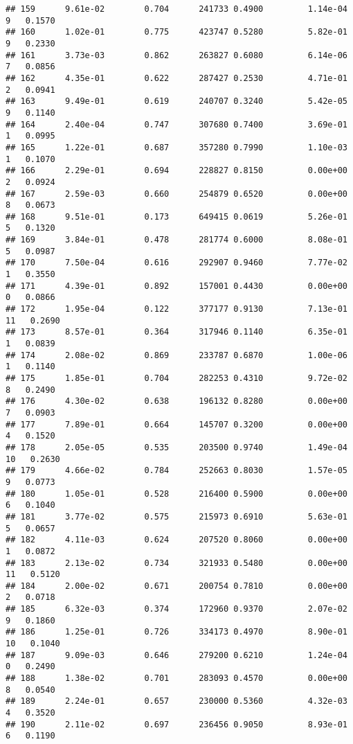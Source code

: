 \documentclass[
]{article}
\begin{document}
\begin{verbatim}
## 159      9.61e-02        0.704      241733 0.4900         1.14e-04   9   0.1570
## 160      1.02e-01        0.775      423747 0.5280         5.82e-01   9   0.2330
## 161      3.73e-03        0.862      263827 0.6080         6.14e-06   7   0.0856
## 162      4.35e-01        0.622      287427 0.2530         4.71e-01   2   0.0941
## 163      9.49e-01        0.619      240707 0.3240         5.42e-05   9   0.1140
## 164      2.40e-04        0.747      307680 0.7400         3.69e-01   1   0.0995
## 165      1.22e-01        0.687      357280 0.7990         1.10e-03   1   0.1070
## 166      2.29e-01        0.694      228827 0.8150         0.00e+00   2   0.0924
## 167      2.59e-03        0.660      254879 0.6520         0.00e+00   8   0.0673
## 168      9.51e-01        0.173      649415 0.0619         5.26e-01   5   0.1320
## 169      3.84e-01        0.478      281774 0.6000         8.08e-01   5   0.0987
## 170      7.50e-04        0.616      292907 0.9460         7.77e-02   1   0.3550
## 171      4.39e-01        0.892      157001 0.4430         0.00e+00   0   0.0866
## 172      1.95e-04        0.122      377177 0.9130         7.13e-01  11   0.2690
## 173      8.57e-01        0.364      317946 0.1140         6.35e-01   1   0.0839
## 174      2.08e-02        0.869      233787 0.6870         1.00e-06   1   0.1140
## 175      1.85e-01        0.704      282253 0.4310         9.72e-02   8   0.2490
## 176      4.30e-02        0.638      196132 0.8280         0.00e+00   7   0.0903
## 177      7.89e-01        0.664      145707 0.3200         0.00e+00   4   0.1520
## 178      2.05e-05        0.535      203500 0.9740         1.49e-04  10   0.2630
## 179      4.66e-02        0.784      252663 0.8030         1.57e-05   9   0.0773
## 180      1.05e-01        0.528      216400 0.5900         0.00e+00   6   0.1040
## 181      3.77e-02        0.575      215973 0.6910         5.63e-01   5   0.0657
## 182      4.11e-03        0.624      207520 0.8060         0.00e+00   1   0.0872
## 183      2.13e-02        0.734      321933 0.5480         0.00e+00  11   0.5120
## 184      2.00e-02        0.671      200754 0.7810         0.00e+00   2   0.0718
## 185      6.32e-03        0.374      172960 0.9370         2.07e-02   9   0.1860
## 186      1.25e-01        0.726      334173 0.4970         8.90e-01  10   0.1040
## 187      9.09e-03        0.646      279200 0.6210         1.24e-04   0   0.2490
## 188      1.38e-02        0.701      283093 0.4570         0.00e+00   8   0.0540
## 189      2.24e-01        0.657      230000 0.5360         4.32e-03   4   0.3520
## 190      2.11e-02        0.697      236456 0.9050         8.93e-01   6   0.1190

\end{verbatim}
\end{document}
